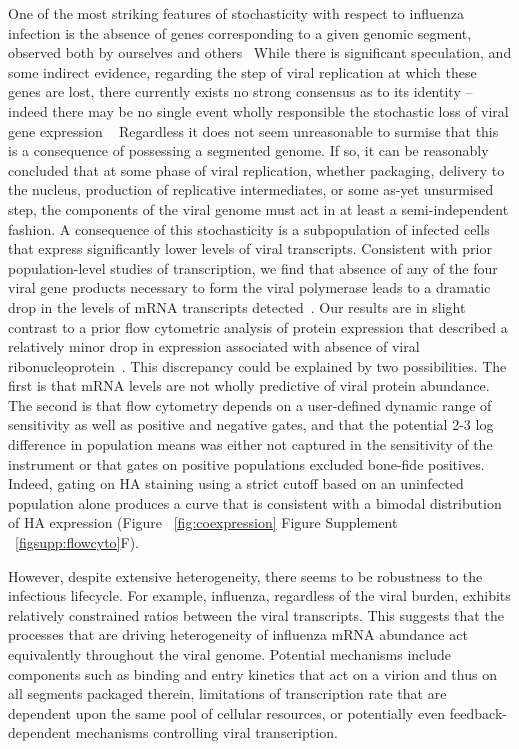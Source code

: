 \documentclass[9pt,lineno]{elife}
\begin{document}
One of the most striking features of stochasticity with respect to influenza infection is the absence of genes corresponding to a given genomic segment, observed both by ourselves and others~\citep{Brooke:2013kb,Dou:2017cp}
While there is significant speculation, and some indirect evidence, regarding the step of viral replication at which these genes are lost, there currently exists no strong consensus as to its identity -- indeed there may be no single event wholly responsible the stochastic loss of viral gene expression ~\citep{Brooke:2017gm, Heldt:2015iz}
Regardless it does not seem unreasonable to surmise that this is a consequence of possessing a segmented genome. If so, it can be reasonably concluded that at some phase of viral replication, whether packaging, delivery to the nucleus, production of replicative intermediates, or some as-yet unsurmised step, the components of the viral genome must act in at least a semi-independent fashion. 
A consequence of this stochasticity is a subpopulation of infected cells that express significantly lower levels of viral transcripts. 
Consistent with prior population-level studies of transcription, we find that absence of any of the four viral gene products necessary to form the viral polymerase leads to a dramatic drop in the levels of mRNA transcripts detected~\citep{Vreede:2004ip,eisfeld2015centre}. 
Our results are in slight contrast to a prior flow cytometric analysis of protein expression that described a relatively minor drop in expression associated with absence of viral ribonucleoprotein~\citep{Brooke:2013kb}.
This discrepancy could be explained by two possibilities. 
The first is that mRNA levels are not wholly predictive of viral protein abundance. 
The second is that flow cytometry depends on a user-defined dynamic range of sensitivity as well as positive and negative gates, and that the potential 2-3 log difference in population means was either not captured in the sensitivity of the instrument or that gates on positive populations excluded bone-fide positives. 
Indeed, gating on HA staining using a strict cutoff based on an uninfected population alone produces a curve that is consistent with a bimodal distribution of HA expression (Figure ~\ref{fig:coexpression} Figure Supplement ~\ref{figsupp:flowcyto}F).

However, despite extensive heterogeneity, there seems to be robustness to the infectious lifecycle.
For example, influenza, regardless of the viral burden, exhibits relatively constrained ratios between the viral transcripts.
This suggests that the processes that are driving heterogeneity of influenza mRNA abundance act equivalently throughout the viral genome.
Potential mechanisms include components such as binding and entry kinetics that act on a virion and thus on all segments packaged therein, limitations of transcription rate that are dependent upon the same pool of cellular resources, or potentially even feedback-dependent mechanisms controlling viral transcription. 
\end{document}
